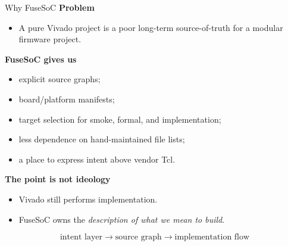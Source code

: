 \documentclass[aspectratio=169]{beamer}
\begin{document}
\begin{frame}{Why FuseSoC}
\small
\textbf{Problem}
\begin{itemize}
  \item A pure Vivado project is a poor long-term source-of-truth for a modular firmware project.
\end{itemize}

\vspace{1mm}
\textbf{FuseSoC gives us}
\begin{itemize}
  \item explicit source graphs;
  \item board/platform manifests;
  \item target selection for smoke, formal, and implementation;
  \item less dependence on hand-maintained file lists;
  \item a place to express intent above vendor Tcl.
\end{itemize}

\vspace{1mm}
\textbf{The point is not ideology}
\begin{itemize}
  \item Vivado still performs implementation.
  \item FuseSoC owns the \emph{description of what we mean to build}.
\end{itemize}

\vspace{1mm}
\[
\text{intent layer} \rightarrow \text{source graph} \rightarrow \text{implementation flow}
\]
\end{frame}
\end{document}
